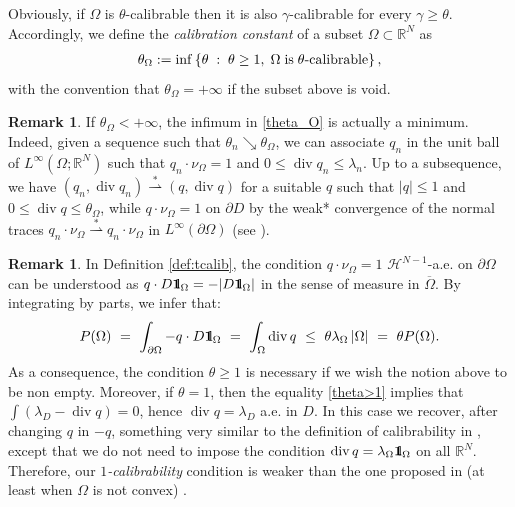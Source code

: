 \documentclass[reqno,11pt]{amsart}
\theoremstyle{definition}
\newtheorem{remark}[theorem]{Remark}
\numberwithin{equation}{section}
\def\ov{\overline}
\DeclareMathOperator{\Div}{div}
\renewcommand{\div}{\Div}
\newcommand{\HH}{\mathcal{H}}
\newcommand{\RR}{\mathbb{R}}
\def\R{\mathbb{R}}
\newcommand{\tinm}[1]{\text{\;#1\;}}
\newcommand{\1}{{{\bf 1}\kern-0,28em\rm l}}
\newcommand{\one}{{{\bf 1}\kern-0,28em\rm l}}
\def\sepa{\; : \;}
\def\sto{\overset{*}{\rightharpoonup}}
\newcommand{\aco}[1]{\left\{#1\right\}}
\def\O{\Omega}
\def\l{\lambda}
\begin{document}
Obviously, if $\Omega$ is $\theta$-calibrable then it is also $\gamma$-calibrable for every $\gamma\ge \theta$. Accordingly, we define the {\it calibration constant} of a subset $\Omega\subset\RR^N$ as  
\begin{align}
\theta_\Omega := \inf\aco{ \theta \sepa \theta \ge 1,\; \Omega \tinm{is} \theta\text{-calibrable} } , \label{theta_O}
\end{align} 
with the convention that $\theta_\O =+\infty$ if the subset above is void.

\begin{remark}\label{theta-min-1}  If $\theta_\O<+\infty$, the infimum in \eqref{theta_O} is actually a minimum. Indeed, given a sequence such that $\theta_n \searrow \theta_\O$, we can associate $q_n$ in the unit ball of $L^\infty(\O;\R^N)$ such that $q_n\cdot\nu_\Omega = 1$ and $ 0\le \Div q_n \le \lambda_n$.
Up to a subsequence, we have $(q_n,\Div q_n) \sto (q,\Div q)$ for a suitable $q$ such that $|q|\le 1$ and  $ 0\le \Div q \le \theta_\O$, while
$q\cdot\nu_\Omega = 1$ on $\partial D$ by the weak* convergence of the normal traces $q_n\cdot\nu_\Omega \sto q_n\cdot\nu_\Omega$ in $L^\infty(\partial\O)$
(see \cite{Anzelloti1984}).

\end{remark}




\begin{remark}\label{1calib}
In Definition \ref{def:tcalib},  the condition $q\cdot\nu_\Omega = 1$ $\HH^{N-1}$-a.e. on $\partial\Omega $ can be understood as $q \cdot D \one_\Omega = -|D \one_\Omega|$ in the sense of measure in $\ov\Omega$. By integrating by parts, we infer that:
\begin{equation}\label{theta>1}
 P(\O)\ =\ \int_{\partial\O} -  q \cdot D \one_\Omega\ =\ \int_\O \Div q\ \le\ \theta \l_\O \, |\Omega| \ =\ \theta P(\O) .  
\end{equation}
As a consequence,  the condition $\theta\ge 1$ is necessary if we wish  the notion above to be non empty.
Moreover, if $\theta=1$, then the equality \eqref{theta>1} implies that $\int ( \l_D - \Div q)=0$, hence $\div q=\l_D$ a.e. in $D$.
In this case we recover, after changing $q$ in $-q$,  something very similar to the definition of calibrability  in \cite[Definition 1]{alter2005characterization}, except that we do not need to impose the condition $\div q = \l_\O \one_\O$ on all $\R^N$. Therefore, our  \emph{$1$-calibrability} condition is weaker than the one
proposed in  \cite{alter2005characterization} (at least when $\O$ is not convex) .



\end{remark}
\end{document}
